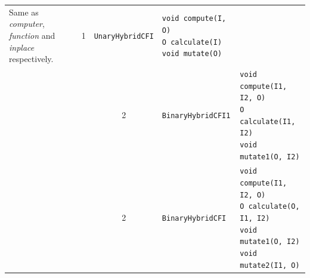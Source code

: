 \documentclass{bmcart}
\begin{document}
\begin{backmatter}
\begin{table}[h!]
\begin{tabular}{| l | l | c | l | p{1.4in} |}
{                                   Same as \textit{computer}, \textit{function} and \textit{inplace} respectively.
                                   }                     & 1              & \texttt{UnaryHybridCFI}    & \parbox[t]{2in}{
                                                                                                         \texttt{void compute(I, O)}\\
                                                                                                         \texttt{O calculate(I)}\\
                                                                                                         \texttt{void mutate(O)}
                                                                                                         }                                   \\[0.25in] 
                                 &                       & 2              & \texttt{BinaryHybridCFI1}  & \parbox[t]{2in}{
                                                                                                         \texttt{void compute(I1, I2, O)}\\
                                                                                                         \texttt{O calculate(I1, I2)}\\
                                                                                                         \texttt{void mutate1(O, I2)}
                                                                                                         }                                   \\[0.25in] 
                                 &                       & 2              & \texttt{BinaryHybridCFI}   & \parbox[t]{2in}{
                                                                                                         \texttt{void compute(I1, I2, O)}\\
                                                                                                         \texttt{O calculate(O, I1, I2)}\\
                                                                                                         \texttt{void mutate1(O, I2)}\\
                                                                                                         \texttt{void mutate2(I1, O)}
                                                                                                         }                                   \\[0.4in] \hline
    \end{tabular}
  \end{table}


\end{backmatter}
\end{document}
